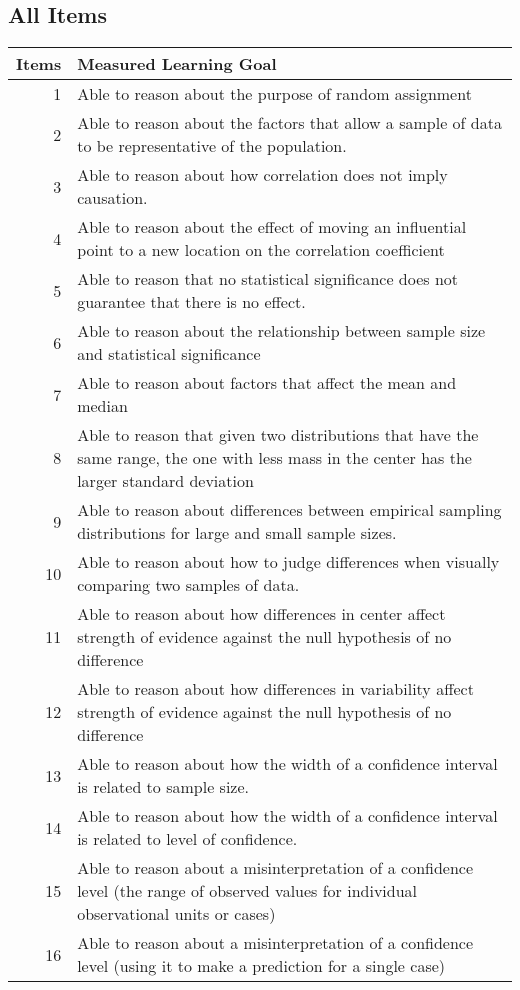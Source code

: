 \documentclass[11pt]{article}
\begin{document}
\subsection{All Items}
\label{sec-3-1}
\begin{center}
\begin{tabular}{rl}
\textbf{Items} & \textbf{Measured Learning Goal}\\
\hline
1 & Able to reason about the purpose of random assignment\\
2 & Able to reason about the factors that allow a sample of data to be representative of the population.\\
3 & Able to reason about how correlation does not imply causation.\\
4 & Able to reason about the effect of  moving an influential point to a new location on the correlation coefficient\\
5 & Able to reason that no statistical significance does not guarantee that there is no effect.\\
6 & Able to reason about the relationship between sample size and statistical significance\\
7 & Able to reason about factors that affect the mean and median\\
8 & Able to reason that given two distributions that have the same range, the one with less mass in the center has the larger standard deviation\\
9 & Able to reason about differences between empirical sampling distributions for large and small sample sizes.\\
10 & Able to reason about how to judge differences when visually comparing two samples of data.\\
11 & Able to reason about how differences in center affect strength of evidence against the null hypothesis of no difference\\
12 & Able to reason about how differences in variability affect strength of evidence against the null hypothesis of no difference\\
13 & Able to reason about how the width of a confidence interval is related to sample size.\\
14 & Able to reason about how the width of a confidence interval is related to level of confidence.\\
15 & Able to reason about a misinterpretation of a confidence level (the range of observed values for individual observational units or cases)\\
16 & Able to reason about a misinterpretation of a confidence level (using it to make a prediction for a single case)\\

\end{tabular}
\end{center}
\end{document}
